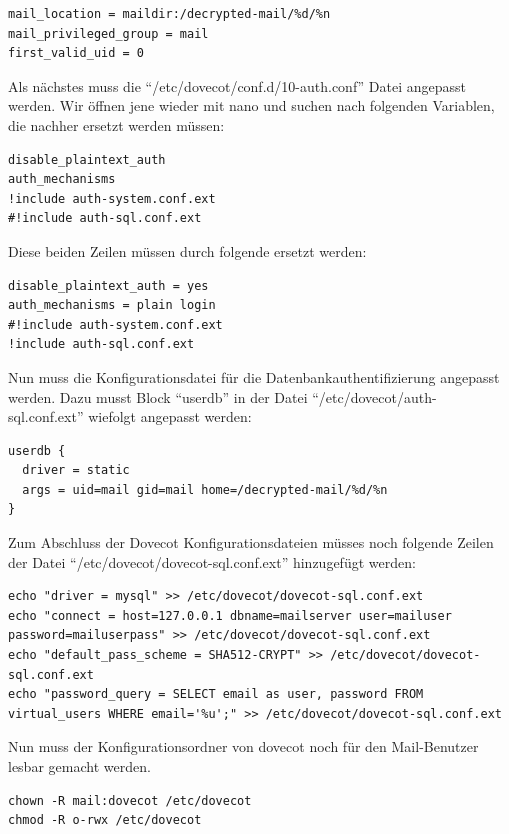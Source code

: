\begin{lstlisting}
mail_location = maildir:/decrypted-mail/%d/%n
mail_privileged_group = mail
first_valid_uid = 0
\end{lstlisting}

Als nächstes muss die ``/etc/dovecot/conf.d/10-auth.conf'' Datei angepasst werden.
Wir öffnen jene wieder mit nano und suchen nach folgenden Variablen, die nachher ersetzt werden müssen:

\begin{lstlisting}
disable_plaintext_auth
auth_mechanisms
!include auth-system.conf.ext
#!include auth-sql.conf.ext
\end{lstlisting} 

Diese beiden Zeilen müssen durch folgende ersetzt werden:

\begin{lstlisting}
disable_plaintext_auth = yes
auth_mechanisms = plain login
#!include auth-system.conf.ext
!include auth-sql.conf.ext
\end{lstlisting}

Nun muss die Konfigurationsdatei für die Datenbankauthentifizierung angepasst werden.
Dazu musst Block ``userdb'' in der Datei ``/etc/dovecot/auth-sql.conf.ext'' wiefolgt angepasst werden:

\begin{lstlisting}
userdb {
  driver = static
  args = uid=mail gid=mail home=/decrypted-mail/%d/%n
}
\end{lstlisting}

Zum Abschluss der Dovecot Konfigurationsdateien müsses noch folgende Zeilen der Datei ``/etc/dovecot/dovecot-sql.conf.ext'' hinzugefügt werden:

\begin{lstlisting}
echo "driver = mysql" >> /etc/dovecot/dovecot-sql.conf.ext
echo "connect = host=127.0.0.1 dbname=mailserver user=mailuser password=mailuserpass" >> /etc/dovecot/dovecot-sql.conf.ext
echo "default_pass_scheme = SHA512-CRYPT" >> /etc/dovecot/dovecot-sql.conf.ext
echo "password_query = SELECT email as user, password FROM virtual_users WHERE email='%u';" >> /etc/dovecot/dovecot-sql.conf.ext
\end{lstlisting}

Nun muss der Konfigurationsordner von dovecot noch für den Mail-Benutzer lesbar gemacht werden.

\begin{lstlisting}
chown -R mail:dovecot /etc/dovecot
chmod -R o-rwx /etc/dovecot
\end{lstlisting}


